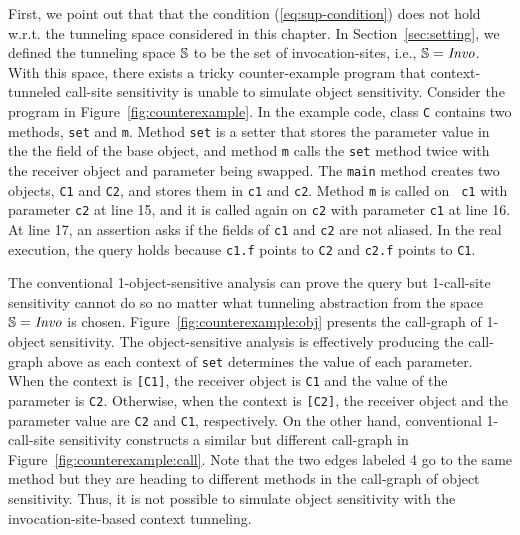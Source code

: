 First, we point out that that the condition (\ref{eq:sup-condition}) does not hold w.r.t. the tunneling space considered in this chapter. 
In Section~\ref{sec:setting}, we defined the tunneling space $\mathbb{S}$ to be the set of invocation-sites, i.e., $\mathbb{S} = \text{\it Invo}$. 
With this space, there exists a tricky counter-example program that context-tunneled
call-site sensitivity is unable to simulate object sensitivity.
Consider the program in Figure~\ref{fig:counterexample}. 
In the example code, class {\tt C} contains two methods, {\tt set} and {\tt m}.
Method {\tt set} is a setter that stores the parameter value in the
the field of the base object,
and method {\tt m} calls the {\tt set} method twice
with the receiver object and parameter being swapped.
The {\tt main} method creates two objects, {\tt C1} and {\tt C2}, and
stores them in {\tt c1} and {\tt c2}. Method {\tt m} is called on {\tt
  c1} with parameter {\tt c2} at line 15, and it is called again on
{\tt c2} with parameter {\tt c1} at line 16.
At line 17, an assertion asks if
the fields of {\tt c1} and {\tt c2} are not aliased.
In the real execution, the query holds because {\tt c1.f} points to {\tt C2} and
{\tt c2.f} points to {\tt C1}.

The conventional 1-object-sensitive analysis can prove the query but
1-call-site sensitivity cannot do so no matter what tunneling abstraction from the space $\mathbb{S} = \text{\it Invo}$ is
chosen.
Figure~\ref{fig:counterexample:obj} presents
the call-graph of 1-object sensitivity.
The object-sensitive analysis is effectively producing the call-graph above as
each context of {\tt set} determines the value of each parameter.
When the context is {\tt [C1]}, the receiver object is {\tt C1} and the value of the parameter is {\tt C2}.
Otherwise, when the context is {\tt [C2]}, the receiver object and the
parameter value are  {\tt C2} and {\tt C1}, respectively.
On the other hand, conventional 1-call-site sensitivity constructs a similar but
different call-graph in Figure~\ref{fig:counterexample:call}.
Note that the two edges labeled 4 go
to the same method but they are heading to different methods in the call-graph of object sensitivity. 
Thus, it is not possible to simulate object sensitivity with the invocation-site-based context tunneling. 




